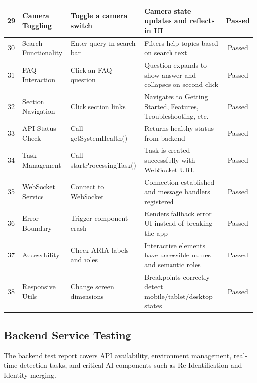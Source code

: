 \begin{longtable}{|c|p{4cm}|p{4cm}|p{4cm}|c|}
29 & Camera Toggling & Toggle a camera switch & Camera state updates and reflects in UI & Passed \\ \hline
30 & Search Functionality & Enter query in search bar & Filters help topics based on search text & Passed \\ \hline
31 & FAQ Interaction & Click an FAQ question & Question expands to show answer and collapses on second click & Passed \\ \hline
32 & Section Navigation & Click section links & Navigates to Getting Started, Features, Troubleshooting, etc. & Passed \\ \hline
33 & API Status Check & Call getSystemHealth() & Returns healthy status from backend & Passed \\ \hline
34 & Task Management & Call startProcessingTask() & Task is created successfully with WebSocket URL & Passed \\ \hline
35 & WebSocket Service & Connect to WebSocket & Connection established and message handlers registered & Passed \\ \hline
36 & Error Boundary & Trigger component crash & Renders fallback error UI instead of breaking the app & Passed \\ \hline
37 & Accessibility & Check ARIA labels and roles & Interactive elements have accessible names and semantic roles & Passed \\ \hline
38 & Responsive Utils & Change screen dimensions & Breakpoints correctly detect mobile/tablet/desktop states & Passed \\ \hline
\end{longtable}

\subsection{Backend Service Testing}
The backend test report covers API availability, environment management, real-time detection tasks, and critical AI components such as Re-Identification and Identity merging.

